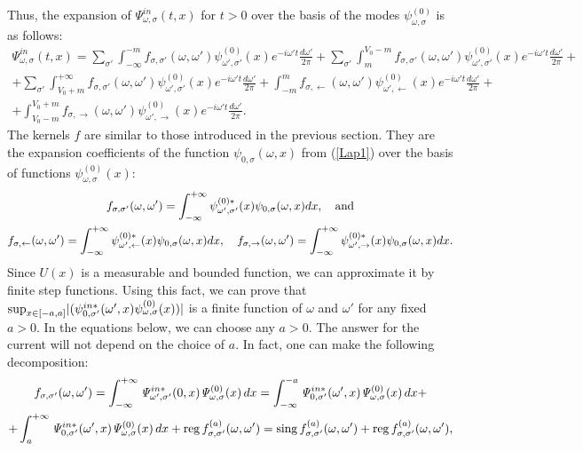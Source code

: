 \documentclass[12pt]{article}
\numberwithin{equation}{section}
\begin{document}
Thus, the expansion of $\mathit{\Psi}^{in}_{\omega,\sigma}(t,x)$ for $t > 0$ over the basis of the modes $\mathit{\psi}^{(0)}_{\omega,\sigma}$ is as follows:
\begin{gather}
\mathit{\Psi}^{in}_{\omega,\sigma}(t,x)=\sum_{\sigma'}\int^{-m}_{-\infty}f_{\sigma,\sigma'}(\omega,\omega')\mathit{\psi}^{(0)}_{\omega',\sigma'}(x)e^{-i\omega't}\frac{d\omega'}{2\pi}+\sum_{\sigma'}\int^{V_0-m}_{m}f_{\sigma,\sigma'}(\omega,\omega')\mathit{\psi}^{(0)}_{\omega',\sigma'}(x)e^{-i\omega't}\frac{d\omega'}{2\pi}+\nonumber\\+\sum_{\sigma'}\int^{+\infty}_{V_0+m}f_{\sigma,\sigma'}(\omega,\omega')\mathit{\psi}^{(0)}_{\omega',\sigma'}(x)e^{-i\omega't}\frac{d\omega'}{2\pi}+\int^{m}_{-m}f_{\sigma,\leftarrow}(\omega,\omega')\mathit{\psi}^{(0)}_{\omega',\leftarrow}(x)e^{-i\omega't}\frac{d\omega'}{2\pi}+\nonumber\\+\int^{V_0+m}_{V_0-m}f_{\sigma,\rightarrow}(\omega,\omega')\mathit{\psi}^{(0)}_{\omega',\rightarrow}(x)e^{-i\omega't}\frac{d\omega'}{2\pi}. \label{Lap2}
\end{gather}
The kernels $f$ are similar to those introduced in the previous section. They are the expansion coefficients of the function $\mathit{\psi}_{0,\sigma}(\omega, x)$ from (\ref{Lap1}) over the basis of functions $\mathit{\psi}^{(0)}_{\omega,\sigma}(x)$:
\begin{gather}
f_{\sigma,\sigma'}(\omega,\omega')=\int^{+\infty}_{-\infty}\mathit{\psi}^{(0)*}_{\omega',\sigma'}(x)\mathit{\psi}_{0,\sigma}(\omega,x)dx, \quad {\rm and} \\
f_{\sigma,\leftarrow}(\omega,\omega')=\int^{+\infty}_{-\infty}\mathit{\psi}^{(0)*}_{\omega',\leftarrow}(x)\mathit{\psi}_{0,\sigma}(\omega,x)dx, \quad 
f_{\sigma,\rightarrow}(\omega,\omega')=\int^{+\infty}_{-\infty}\mathit{\psi}^{(0)*}_{\omega',\rightarrow}(x)\mathit{\psi}_{0,\sigma}(\omega,x)dx. \nonumber
\end{gather}
Since $U(x)$ is a measurable and bounded function, we can approximate it by finite step functions. Using this fact, we can prove that ${\rm sup}_{x\in[-a,a]}|(\mathit{\psi}^{in*}_{0,\sigma'}(\omega',x)\mathit{\psi}^{(0)}_{\omega,\sigma}(x))|$ is a finite function of $\omega$ and $\omega'$ for any fixed $a>0$. In the equations below, we can choose any $a>0$. The answer for the current will not depend on the choice of $a$. In fact, one can make the following decomposition:
\begin{gather}
f_{\sigma,\sigma'}(\omega,\omega')=\int^{+\infty}_{-\infty} \mathit{\Psi}^{in*}_{\omega',\sigma'}(0,x)\mathit{\Psi}^{(0)}_{\omega,\sigma}(x) \, dx = \int^{-a}_{-\infty} \mathit{\Psi}^{in*}_{0,\sigma'}(\omega',x)\mathit{\Psi}^{(0)}_{\omega,\sigma}(x) \, dx + \nonumber \\ + \int^{+\infty}_a \mathit{\Psi}^{in*}_{0,\sigma'}(\omega',x)\mathit{\Psi}^{(0)}_{\omega,\sigma}(x) \, dx + {\rm reg} \,  f^{(a)}_{\sigma,\sigma'}(\omega,\omega') = {\rm sing}\, f^{(a)}_{\sigma,\sigma'}(\omega,\omega') + {\rm reg}\, f^{(a)}_{\sigma,\sigma'}(\omega,\omega'), \label{Decompeq}
\end{gather}
\end{document}
